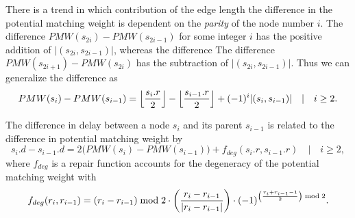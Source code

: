 There is a trend in which contribution of the edge length the difference in the potential matching weight is dependent on the \emph{parity} of the node number $i$. The difference $ PMW(s_{2i}) - PMW(s_{2i-1})$ for some integer $i$ has the positive addition of $|(s_{2i}, s_{2i-1})|$, whereas the difference The difference $ PMW(s_{2i+1}) - PMW(s_{2i})$ has the subtraction of $|(s_{2i}, s_{2i-1})|$. Thus we can generalize the difference as
\begin{equation}\label{eq:pmwdiff}
  PMW(s_i) - PMW(s_{i-1}) = {\left \lfloor \frac{s_i.r}{2} \right \rfloor } - {\left \lfloor \frac{s_{i-1}.r}{2} \right \rfloor } + (-1)^{i}\abs{(s_i,s_{i-1})} \hspace{1em} | \hspace{1em} i\geq 2.
\end{equation}

\begin{lemma}
  The difference in delay between a node $s_i$ and its parent $s_{i-1}$ is related to the difference in potential matching weight by 
  \begin{equation}\label{eq:delaydiff}
    s_i.d - s_{i-1}.d =2\big(PMW(s_i) - PMW(s_{i-1})\big) + f_{deg}(s_i.r, s_{i-1}.r) \hspace{1em} | \hspace{1em} i\geq 2,
  \end{equation}
  where $f_{deg}$ is a repair function accounts for the degeneracy of the potential matching weight with
  \begin{equation}\label{eq:degenrepair}
    f_{deg}(r_i, r_{i-1}) = (r_i - r_{i-1}) \bmod 2 \cdot \left(\frac{r_i - r_{i-1}}{\abs{r_i - r_{i-1}}}\right) \cdot (-1)^{\left(\frac{r_i+r_{i-1}-1}{2}\right)\bmod 2} .
  \end{equation}
\end{lemma}
